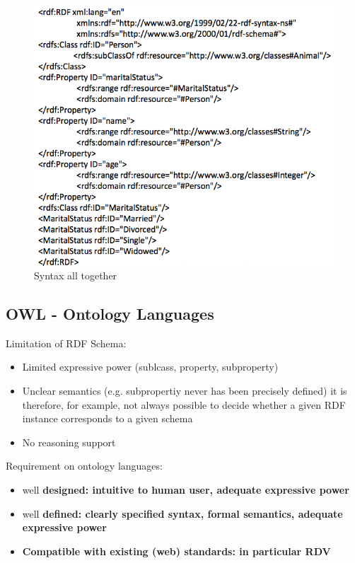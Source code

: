 \begin{figure}[H]
\begin{center}
\includegraphics[width=1\linewidth]{figures/rdf_syntax.png}
\end{center}
\caption{Syntax all together}
\label{fig:class}
\end{figure}

\subsection{OWL - Ontology Languages}
Limitation of RDF Schema:
\begin{itemize}
	\item Limited expressive power (sublcass, property, subproperty)
	\item Unclear semantics (e.g. subpropertiy never has been precisely defined) it is therefore, for example, not always possible to decide whether a given RDF instance corresponds to a given schema
	\item No reasoning support
\end{itemize}

Requirement on ontology languages:
\begin{itemize}
	\item well \bf{designed}: intuitive to human user, adequate expressive power
	\item well \bf{defined}: clearly specified syntax, formal semantics, adequate expressive power
	\item \bf{Compatible} with existing (web) standards: in particular RDV
\end{itemize}

